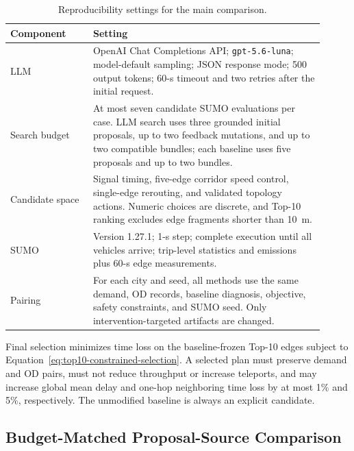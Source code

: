 \begin{table}[!ht]
  \caption{Reproducibility settings for the main comparison.}
  \label{tab:reproducibility-settings}
  \begin{center}
    \begin{tabular}{p{0.24\linewidth}p{0.67\linewidth}}
      \hline
      Component & Setting \\
      \hline
      LLM & OpenAI Chat Completions API; \texttt{gpt-5.6-luna}; model-default
      sampling; JSON response mode; 500 output tokens; 60-s timeout and two
      retries after the initial request. \\
      Search budget & At most seven candidate SUMO evaluations per case. LLM
      search uses three grounded initial proposals, up to two feedback
      mutations, and up to two compatible bundles; each baseline uses five
      proposals and up to two bundles. \\
      Candidate space & Signal timing, five-edge corridor speed control,
      single-edge rerouting, and validated topology actions. Numeric choices
      are discrete, and Top-10 ranking excludes edge fragments shorter than
      10~m. \\
      SUMO & Version 1.27.1; 1-s step; complete execution until all vehicles
      arrive; trip-level statistics and emissions plus 60-s edge measurements. \\
      Pairing & For each city and seed, all methods use the same demand, OD
      records, baseline diagnosis, objective, safety constraints, and SUMO
      seed. Only intervention-targeted artifacts are changed. \\
      \hline
    \end{tabular}
  \end{center}
\end{table}

Final selection minimizes time loss on the baseline-frozen Top-10 edges subject
to Equation~\ref{eq:top10-constrained-selection}.  A selected plan must preserve
demand and OD pairs, must not reduce throughput or increase teleports, and may
increase global mean delay and one-hop neighboring time loss by at most 1\% and
5\%, respectively.  The unmodified baseline is always an explicit candidate.

\subsection{Budget-Matched Proposal-Source Comparison}
\label{sec:proposal-source-comparison}

